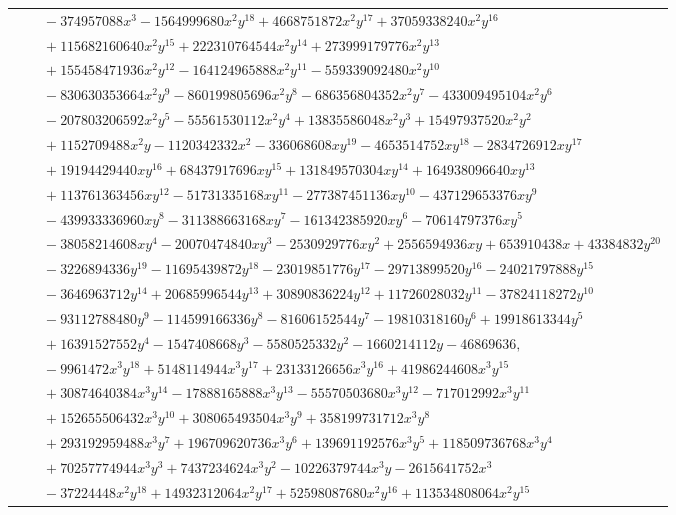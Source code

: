 \documentclass[11pt]{article}
\begin{document}
\begin{longtable}{@{}ll@{}}
 & $\quad -374957088x^{3}-1564999680x^{2}y^{18}+4668751872x^{2}y^{17}+37059338240x^{2}y^{16}$\\
 & $\quad +115682160640x^{2}y^{15}+222310764544x^{2}y^{14}+273999179776x^{2}y^{13}$\\
 & $\quad +155458471936x^{2}y^{12}-164124965888x^{2}y^{11}-559339092480x^{2}y^{10}$\\
 & $\quad -830630353664x^{2}y^{9}-860199805696x^{2}y^{8}-686356804352x^{2}y^{7}-433009495104x^{2}y^{6}$\\
 & $\quad -207803206592x^{2}y^{5}-55561530112x^{2}y^{4}+13835586048x^{2}y^{3}+15497937520x^{2}y^{2}$\\
 & $\quad +1152709488x^{2}y-1120342332x^{2}-336068608xy^{19}-4653514752xy^{18}-2834726912xy^{17}$\\
 & $\quad +19194429440xy^{16}+68437917696xy^{15}+131849570304xy^{14}+164938096640xy^{13}$\\
 & $\quad +113761363456xy^{12}-51731335168xy^{11}-277387451136xy^{10}-437129653376xy^{9}$\\
 & $\quad -439933336960xy^{8}-311388663168xy^{7}-161342385920xy^{6}-70614797376xy^{5}$\\
 & $\quad -38058214608xy^{4}-20070474840xy^{3}-2530929776xy^{2}+2556594936xy+653910438x+43384832y^{20}$\\
 & $\quad -3226894336y^{19}-11695439872y^{18}-23019851776y^{17}-29713899520y^{16}-24021797888y^{15}$\\
 & $\quad -3646963712y^{14}+20685996544y^{13}+30890836224y^{12}+11726028032y^{11}-37824118272y^{10}$\\
 & $\quad -93112788480y^{9}-114599166336y^{8}-81606152544y^{7}-19810318160y^{6}+19918613344y^{5}$\\
 & $\quad +16391527552y^{4}-1547408668y^{3}-5580525332y^{2}-1660214112y-46869636,$\\
 & $\quad -9961472x^{3}y^{18}+5148114944x^{3}y^{17}+23133126656x^{3}y^{16}+41986244608x^{3}y^{15}$\\
 & $\quad +30874640384x^{3}y^{14}-17888165888x^{3}y^{13}-55570503680x^{3}y^{12}-717012992x^{3}y^{11}$\\
 & $\quad +152655506432x^{3}y^{10}+308065493504x^{3}y^{9}+358199731712x^{3}y^{8}$\\
 & $\quad +293192959488x^{3}y^{7}+196709620736x^{3}y^{6}+139691192576x^{3}y^{5}+118509736768x^{3}y^{4}$\\
 & $\quad +70257774944x^{3}y^{3}+7437234624x^{3}y^{2}-10226379744x^{3}y-2615641752x^{3}$\\
 & $\quad -37224448x^{2}y^{18}+14932312064x^{2}y^{17}+52598087680x^{2}y^{16}+113534808064x^{2}y^{15}$\\

\end{longtable}
\end{document}
